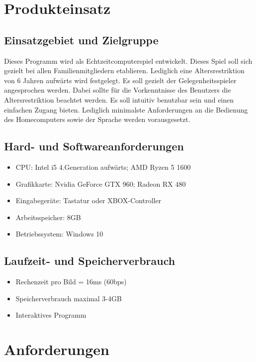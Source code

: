 \documentclass[parskip=full]{scrartcl}
\begin{document}
	\pagebreak

	\section{Produkteinsatz}
	\subsection{Einsatzgebiet und Zielgruppe}
	Dieses Programm wird als Echtzeitcomputerspiel entwickelt.
	Dieses Spiel soll sich gezielt bei allen Familienmitgliedern etablieren.
	Lediglich eine Altersrestriktion von 6 Jahren aufwärts wird
	festgelegt. 
	Es soll gezielt der Gelegenheitsspieler angesprochen werden.
	Dabei sollte für die Vorkenntnisse des Benutzers die Altersrestriktion 
	beachtet werden. Es soll intuitiv benutzbar sein und einen einfachen 
	Zugang bieten. Lediglich minimalste Anforderungen an die Bedienung
	des Homecomputers sowie der Sprache werden vorausgesetzt.
	
	
	\subsection{Hard- und Softwareanforderungen}
	\begin{itemize}
		\item CPU: Intel i5 4.Generation aufwärts; AMD Ryzen 5 1600
		\item Grafikkarte: Nvidia GeForce GTX 960; Radeon RX 480 
		\item Eingabegeräte: Tastatur oder XBOX-Controller
		\item Arbeitsspeicher: 8GB
		\item Betriebssystem: Windows 10
	\end{itemize}
	\subsection{Laufzeit- und Speicherverbrauch}
	\begin{itemize}
		\item Rechenzeit pro Bild = 16ms (60bps)
		\item Speicherverbrauch maximal 3-4GB
		\item Interaktives Programm
	\end{itemize}
	
	\pagebreak
	
	\section{Anforderungen}
\end{document}
